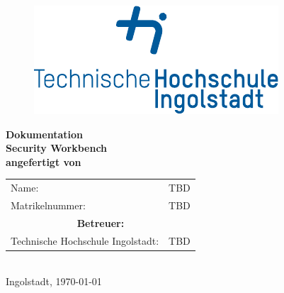 
\begin{titlepage}

\phantom{tmpText}

\vspace{1cm}

\begin{figure}[h!]
\centering
\includegraphics[width=\textwidth]{bilder/thi_logo_cropped.pdf}
\end{figure}

  \begin{center}

    
    
    \textbf{{\large Dokumentation} \\[3ex]
    {\LARGE Security Workbench} \\[1ex]
    \vfill
    angefertigt von} \\
    \begin{tabular}{ll}
    	Name: & TBD\\
    	Matrikelnummer: & TBD\\[2ex]
    	\multicolumn{2}{c}{\textbf{Betreuer:}}\\
    	Technische Hochschule Ingolstadt: & TBD
    \end{tabular}\\[2ex] %
    \vfill
    Ingolstadt, \today
  \end{center}
\end{titlepage}
